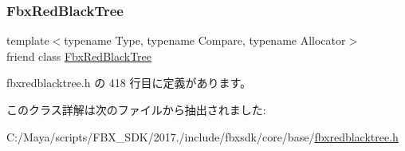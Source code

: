 \subsubsection{\texorpdfstring{Fbx\+Red\+Black\+Tree}{FbxRedBlackTree}}
{\footnotesize\ttfamily template$<$typename Type, typename Compare, typename Allocator$>$ \\
friend class \hyperlink{class_fbx_red_black_tree}{Fbx\+Red\+Black\+Tree}\hspace{0.3cm}{\ttfamily [friend]}}



 fbxredblacktree.\+h の 418 行目に定義があります。



このクラス詳解は次のファイルから抽出されました\+:\begin{DoxyCompactItemize}
\item 
C\+:/\+Maya/scripts/\+F\+B\+X\+\_\+\+S\+D\+K/2017./include/fbxsdk/core/base/\hyperlink{fbxredblacktree_8h}{fbxredblacktree.\+h}\end{DoxyCompactItemize}
